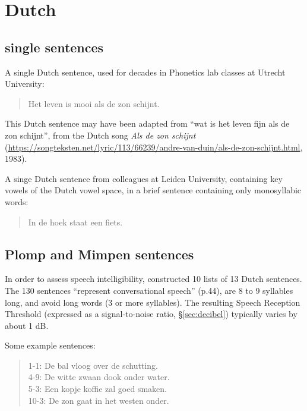 \documentclass[
]{book}
\begin{document}
\section{Dutch}\label{dutch}

\subsection{single sentences}\label{single-sentences}

A single Dutch sentence, used for decades in Phonetics lab classes at Utrecht University:

\begin{quote}
Het leven is mooi als de zon schijnt.
\end{quote}

This Dutch sentence may have been adapted from ``wat is het leven fijn als de zon schijnt'', from the Dutch song \emph{Als de zon schijnt} (\url{https://songteksten.net/lyric/113/66239/andre-van-duin/als-de-zon-schijnt.html}, 1983).

A singe Dutch sentence from colleagues at Leiden University, containing key vowels of the Dutch vowel space, in a brief sentence containing only monosyllabic words:

\begin{quote}
In de hoek staat een fiets.
\end{quote}

\subsection{Plomp and Mimpen sentences}\label{plomp-and-mimpen-sentences}

In order to assess speech intelligibility, \citet{Plomp_Mimpen_1979} constructed 10 lists of 13 Dutch sentences. The 130 sentences ``represent conversational speech'' (p.44), are 8 to 9 syllables long, and avoid long words (3 or more syllables). The resulting Speech Reception Threshold (expressed as a signal-to-noise ratio, §\ref{sec:decibel}) typically varies by about 1 dB.

Some example sentences:

\begin{quote}
1-1: De bal vloog over de schutting.\\
4-9: De witte zwaan dook onder water.\\
5-3: Een kopje koffie zal goed smaken.\\
10-3: De zon gaat in het westen onder.
\end{quote}
\end{document}
